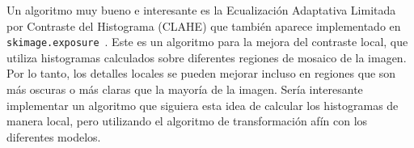 Un algoritmo muy bueno e interesante es la Ecualización Adaptativa Limitada por Contraste del Histograma (CLAHE) que tambi\'en aparece implementado en \verb|skimage.exposure|~\cite{module_exposure}. Este es un algoritmo para la mejora del contraste local, que utiliza histogramas calculados sobre diferentes regiones de mosaico de la imagen. Por lo tanto, los detalles locales se pueden mejorar incluso en regiones que son más oscuras o más claras que la mayoría de la imagen. Ser\'ia interesante implementar un algoritmo que siguiera esta idea de calcular los histogramas de manera local, pero utilizando el algoritmo de transformaci\'on af\'in con los diferentes modelos.